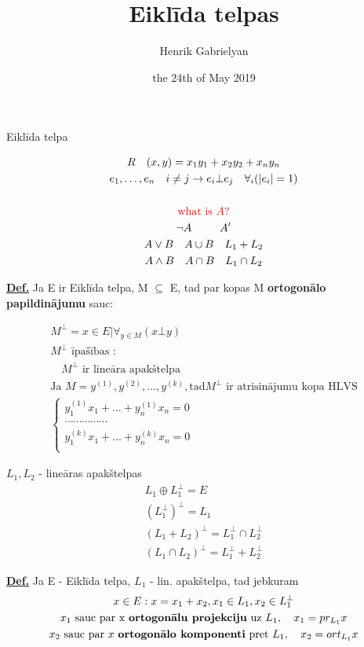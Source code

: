 \documentclass[12pt]{article}
\title{Eiklīda telpas}
\author{Henrik Gabrielyan}
\date{the 24th of May 2019}
\begin{document}
\maketitle

Eiklīda telpa

\begin{gather*}
	R \quad (x,y) = x_1y_1 + x_2y_2 + x_ny_n \\
	e_1, \ldots, e_n \quad i \neq j \rightarrow e_i \bot e_j \quad \forall_i (|e_i| = 1) \\
	\\ \color{red}{\text{what is  } A?} \\
	\neg A  \quad \quad \; \;  A' \\
	A \vee B \quad A \cup B  \quad L_1+L_2 \\	
	A \wedge B \quad A \cap B   \quad  L_1 \cap L_2
\end{gather*}

\textbf{\underline{Def.}}  Ja E ir Eiklīda telpa, M $\subseteq$ E, tad par kopas M \textbf{ortogonālo papildinājumu} sauc:

\begin{gather*}
	M^{\bot} = {x \in E | \forall_{y \in M }(x \bot y)} \\
	M^{\bot} \text{ īpašības :} \\ %
	\quad M^{\bot} \text{ ir lineāra apakštelpa} \\
	\text{Ja } M = y^{(1)}, y^{(2)}, \ldots, y^{(k)},  \text{tad} M^{\bot} \text{ ir atrisinājumu kopa HLVS} \\
	\begin{cases}
		y_1^{(1)}x_1 + \ldots + y_n^{(1)} x_n = 0 \\
		\cdots \cdots \cdots \cdots \cdots \\
		y_1^{(k)}x_1 + \ldots + y_n^{(k)} x_n = 0 \\
	\end{cases}
\end{gather*}

$L_1, L_2$ - lineāras apakštelpas
\begin{gather*}
	L_1 \oplus L_1^{\bot} = E \\ 
	(L_1^{\bot}) ^ {\bot} = L_1 \\ 
	(L_1 + L_2)^{\bot} = L_1^{\bot} \cap L_2^{\bot} \\
	(L_1 \cap L_2)^{\bot} = L_1^{\bot} +  L_2^{\bot}
\end{gather*}


\textbf{\underline{Def.}}  Ja E - Eiklīda telpa, $L_1$ - lin. apakštelpa, tad jebkuram 
\begin{gather*}
	x \in E: x = x_1 + x_2, x_1 \in L_1, x_2 \in L_1^{\bot} \\
	x_1 \text{ sauc par x \textbf{ortogonālu projekciju} uz } L_1, \quad x_1 = pr_{L_1}x \\
	x_2 \text{ sauc par } x \text{  \textbf{ortogonālo komponenti} pret } L_1,  \quad x_2 = ort_{L_1}x
\end{gather*}
\end{document}
